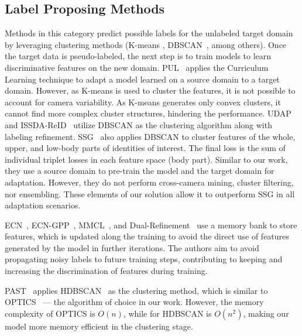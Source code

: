 \documentclass[journal]{IEEEtran}
\begin{document}
\subsection{Label Proposing Methods} 
Methods in this category predict possible labels for the unlabeled target domain by leveraging clustering methods (K-means \cite{lloyd1982kmeans}, DBSCAN~\cite{ester1996density}, among others). Once the target data is pseudo-labeled, the next step is to train models to learn discriminative features on the new domain. PUL~\cite{fan2018unsupervised} applies the Curriculum Learning technique to adapt a model learned on a source domain to a target domain. However, as K-means is used to cluster the features, it is not possible to account for camera variability. As K-means generates only convex clusters, it cannot find more complex cluster structures, hindering the performance. UDAP~\cite{song2020unsupervised} and ISSDA-ReID~\cite{tang2019unsupervised} utilize DBSCAN as the clustering algorithm along with labeling refinement.
SSG~\cite{fu2019self} also applies DBSCAN to cluster features of the whole, upper, and low-body parts of identities of interest. The final loss is the sum of individual triplet losses in each feature space (body part). Similar to our work, they use a source domain to pre-train the model and the target domain for adaptation. However, they do not perform cross-camera mining, cluster filtering, nor ensembling. These elements of our solution allow it to outperform SSG in all adaptation scenarios. \par  

ECN~\cite{zhong2019invariance}, ECN-GPP~\cite{zhong2020learning}, MMCL~\cite{wang2020unsupervised}, and Dual-Refinement~\cite{dai2020dual} use a memory bank to store features, which is updated along the training to avoid the direct use of features generated by the model in further iterations. The authors aim to avoid propagating noisy labels to future training steps, contributing to keeping and increasing the discrimination of features during training. \par  

PAST~\cite{zhang2019self} applies HDBSCAN~\cite{campello2013density} as the clustering method, which is similar to OPTICS~\cite{ankerst1999optics} --- the algorithm of choice in our work. However, the memory complexity of OPTICS is $O(n)$, while for HDBSCAN is $O(n^2)$, making our model more memory efficient in the clustering stage.   \par 
\end{document}
